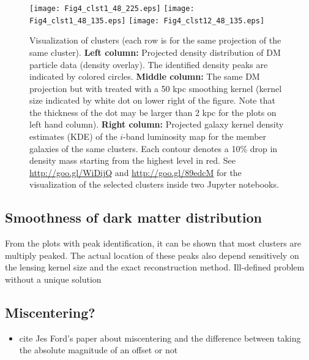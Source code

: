 


\begin{figure*}
	\begin{center}
	\texttt{[image: Fig4\_clst1\_48\_225.eps]}
	\texttt{[image: Fig4\_clst1\_48\_135.eps]}
	\texttt{[image: Fig4\_clst12\_48\_135.eps]}
	\caption{ Visualization of clusters (each row is for the same projection
		of the same cluster). {\bf Left column:} Projected density distribution of DM	
		particle data (density overlay). 
		The identified density peaks are indicated by colored circles. 
		{\bf Middle column:} The same DM projection but with treated with a 50 
		kpc smoothing kernel (kernel size indicated by white dot on lower right of
		the figure. Note that the thickness of the dot may be larger than 2 kpc
		for the plots on left hand column).
		{\bf Right column:} Projected galaxy kernel density estimates (KDE) of 
		the $i$-band luminosity map for the member
		galaxies of the same clusters. Each contour denotes a 10\% drop in density
		mass starting from the highest level in red.
		See \href{http://goo.gl/WiDijQ}{http://goo.gl/WiDijQ} 
		and \href{http://goo.gl/89edcM}{http://goo.gl/89edcM} for the 
		visualization of the selected clusters inside two Jupyter notebooks.
		\label{fig:select_peak_visualization}
	}
\end{center}
\end{figure*}

\subsection{Smoothness of dark matter distribution}
From the plots with peak identification, it can be shown that most clusters are
multiply peaked. The actual location of these peaks also depend sensitively 
on the lensing kernel size and the exact reconstruction method.  
Ill-defined problem without a unique solution 

\subsection{Miscentering?}
\begin{itemize}
		\item cite Jes Ford's paper about miscentering and the difference between
			taking the absolute magnitude of an offset or not 
	\end{itemize}


